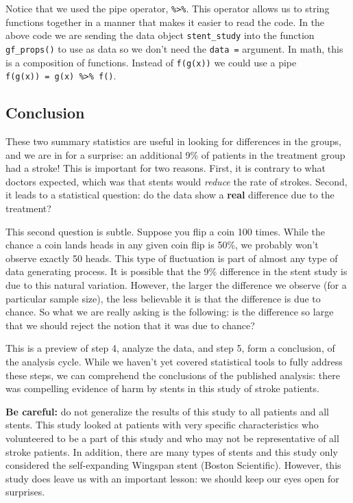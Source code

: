 \documentclass[
]{book}
\begin{document}
Notice that we used the pipe operator, \texttt{\%\textgreater{}\%}. This operator allows us to string functions together in a manner that makes it easier to read the code. In the above code we are sending the data object \texttt{stent\_study} into the function \texttt{gf\_props()} to use as data so we don't need the \texttt{data\ =} argument. In math, this is a composition of functions. Instead of \texttt{f(g(x))} we could use a pipe \texttt{f(g(x))\ =\ g(x)\ \%\textgreater{}\%\ f()}.

\hypertarget{conclusion}{%
\subsection{Conclusion}\label{conclusion}}

These two summary statistics are useful in looking for differences in the groups, and we are in for a surprise: an additional 9\% of patients in the treatment group had a stroke! This is important for two reasons. First, it is contrary to what doctors expected, which was that stents would \emph{reduce} the rate of strokes. Second, it leads to a statistical question: do the data show a \textbf{real} difference due to the treatment?

This second question is subtle. Suppose you flip a coin 100 times. While the chance a coin lands heads in any given coin flip is 50\%, we probably won't observe exactly 50 heads. This type of fluctuation is part of almost any type of data generating process. It is possible that the 9\% difference in the stent study is due to this natural variation. However, the larger the difference we observe (for a particular sample size), the less believable it is that the difference is due to chance. So what we are really asking is the following: is the difference so large that we should reject the notion that it was due to chance?

This is a preview of step 4, analyze the data, and step 5, form a conclusion, of the analysis cycle. While we haven't yet covered statistical tools to fully address these steps, we can comprehend the conclusions of the published analysis: there was compelling evidence of harm by stents in this study of stroke patients.

\textbf{Be careful:} do not generalize the results of this study to all patients and all stents. This study looked at patients with very specific characteristics who volunteered to be a part of this study and who may not be representative of all stroke patients. In addition, there are many types of stents and this study only considered the self-expanding Wingspan stent (Boston Scientific). However, this study does leave us with an important lesson: we should keep our eyes open for surprises.
\end{document}
